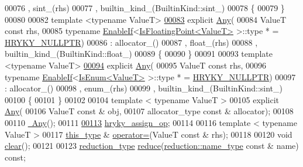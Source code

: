 \begin{DoxyCode}
00076           , sint\_(rhs)
00077           , builtin\_kind\_(BuiltinKind::sint\_)
00078     \{
00079     \}
00080 
00082     \textcolor{keyword}{template} <\textcolor{keyword}{typename} ValueT>
\hypertarget{any_8h_source_l00083}{}\hyperlink{classhryky_1_1_any_aeb3fe2ce3157fc1d59d5f681c41d4aed}{00083}     \textcolor{keyword}{explicit} \hyperlink{classhryky_1_1_any_a3d0d9135c798b3bfb4428fc04f168414}{Any}(
00084         ValueT \textcolor{keyword}{const} rhs,
00085         \textcolor{keyword}{typename} \hyperlink{classhryky_1_1_enable_if}{EnableIf}<\hyperlink{classhryky_1_1_is_floating_point}{IsFloatingPoint<ValueT>} >::type * = \hyperlink{common_8h_a4cd4ac09cfcdbd6b30ee69afc156e210}{HRYKY_NULLPTR})
00086         : allocator\_()
00087           , float\_(rhs)
00088           , builtin\_kind\_(BuiltinKind::float\_)
00089     \{
00090     \}
00091 
00093     \textcolor{keyword}{template} <\textcolor{keyword}{typename} ValueT>
\hypertarget{any_8h_source_l00094}{}\hyperlink{classhryky_1_1_any_abc9a34a6126cea0b2449159c5d121d46}{00094}     \textcolor{keyword}{explicit} \hyperlink{classhryky_1_1_any_a3d0d9135c798b3bfb4428fc04f168414}{Any}(
00095         ValueT \textcolor{keyword}{const} rhs,
00096         \textcolor{keyword}{typename} \hyperlink{classhryky_1_1_enable_if}{EnableIf}<\hyperlink{classhryky_1_1_is_enum}{IsEnum<ValueT>} >::type * = \hyperlink{common_8h_a4cd4ac09cfcdbd6b30ee69afc156e210}{HRYKY_NULLPTR})
00097         : allocator\_()
00098           , enum\_(rhs)
00099           , builtin\_kind\_(BuiltinKind::sint\_)
00100     \{
00101     \}
00102 
00104     \textcolor{keyword}{template} < \textcolor{keyword}{typename} ValueT >
00105     \textcolor{keyword}{explicit} \hyperlink{classhryky_1_1_any_a3d0d9135c798b3bfb4428fc04f168414}{Any}(
00106         ValueT \textcolor{keyword}{const} & obj,
00107         allocator\_type \textcolor{keyword}{const} & allocator);
00108 
00110     \hyperlink{classhryky_1_1_any_a703e5beebe52102b0db2cef37f92df3f}{~Any}();
00111 
\hypertarget{any_8h_source_l00113}{}\hyperlink{classhryky_1_1_any_a1c57a0eab6d8c5b21bc607eb2c2b0a76}{00113}     \hyperlink{classhryky_1_1_any_a1c57a0eab6d8c5b21bc607eb2c2b0a76}{hryky_assign_op};
00114 
00116     \textcolor{keyword}{template} < \textcolor{keyword}{typename} ValueT >
00117     \hyperlink{classhryky_1_1_any}{this_type} & \hyperlink{classhryky_1_1_any_a84875d62c0f9f76ddcfb896b8ab6a275}{operator=}(ValueT \textcolor{keyword}{const} & rhs);
00118 
00120     \textcolor{keywordtype}{void} \hyperlink{classhryky_1_1_any_a307624acbd5252242b0665a0d5d5e62e}{clear}();
00121 
00123     \hyperlink{classhryky_1_1_intrusive_ptr}{reduction_type} \hyperlink{classhryky_1_1_any_a53cbd925fa67505daab6e79749559517}{reduce}(\hyperlink{classhryky_1_1reduction_1_1_string}{reduction::name_type} \textcolor{keyword}{const} & name) \textcolor{keyword}{const};

\end{DoxyCode}
